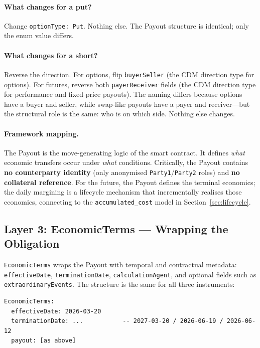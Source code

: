\documentclass[11pt,a4paper]{article}
\begin{document}
\paragraph{What changes for a put?} Change \texttt{optionType: Put}. Nothing else. The Payout structure is identical; only the enum value differs.

\paragraph{What changes for a short?} Reverse the direction. For options, flip \texttt{buyerSeller} (the CDM direction type for options). For futures, reverse both \texttt{payerReceiver} fields (the CDM direction type for performance and fixed-price payouts). The naming differs because options have a buyer and seller, while swap-like payouts have a payer and receiver---but the structural role is the same: who is on which side. Nothing else changes.

\paragraph{Framework mapping.} The Payout is the move-generating logic of the smart contract. It defines \textit{what} economic transfers occur under \textit{what} conditions. Critically, the Payout contains \textbf{no counterparty identity} (only anonymised \texttt{Party1}/\texttt{Party2} roles) and \textbf{no collateral reference}. For the future, the Payout defines the terminal economics; the daily margining is a lifecycle mechanism that incrementally realises those economics, connecting to the \texttt{accumulated\_cost} model in Section~\ref{sec:lifecycle}.

\subsection{Layer 3: EconomicTerms --- Wrapping the Obligation}
\label{sec:cdm-econterms}

\texttt{EconomicTerms} wraps the Payout with temporal and contractual metadata: \texttt{effectiveDate}, \texttt{terminationDate}, \texttt{calculationAgent}, and optional fields such as \texttt{extraordinaryEvents}. The structure is the same for all three instruments:

\begin{lstlisting}
EconomicTerms:
  effectiveDate: 2026-03-20
  terminationDate: ...           -- 2027-03-20 / 2026-06-19 / 2026-06-12
  payout: [as above]
\end{lstlisting}
\end{document}
